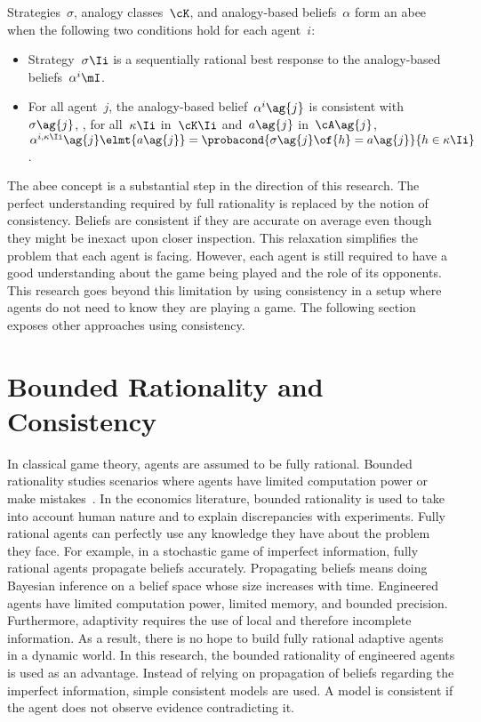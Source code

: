 Strategies~\(\sigma\), analogy classes~\(\cK\), and analogy-based beliefs~\(\alpha\) form an \ac{abee} when the following two conditions hold for each agent~\(i\):
\begin{itemize}
\item Strategy~\(\sigma\Ii\) is a sequentially rational best response to the analogy-based beliefs~\(\alpha\belief{i}\mI\).
\item For all agent~\(j\), the analogy-based belief~\(\alpha\belief{i}\ag{j}\) is consistent with~\(\sigma\ag{j}\), \ie, for all~\(\kappa\Ii\) in~\(\cK\Ii\) and~\(a\ag{j}\) in~\(\cA\ag{j}\), \(\alpha\belief{i, \kappa\Ii}\ag{j}\elmt{a\ag{j}} = \probacond{\sigma\ag{j} \of{h} = a\ag{j}}{h \in \kappa\Ii}\).
\end{itemize}

The \ac{abee} concept is a substantial step in the direction of this research.
The perfect understanding required by full rationality is replaced by the notion of consistency.
Beliefs are consistent if they are accurate on average even though they might be inexact upon closer inspection.
This relaxation simplifies the problem that each agent is facing.
However, each agent is still required to have a good understanding about the game being played and the role of its opponents.
This research goes beyond this limitation by using consistency in a setup where agents do not need to know they are playing a game.
The following section exposes other approaches using consistency.


\section{Bounded Rationality and Consistency}

In classical game theory, agents are assumed to be fully rational.
Bounded rationality studies scenarios where agents have limited computation power or make mistakes~\cite{rubinstein:1998}.
In the economics literature, bounded rationality is used to take into account human nature and to explain discrepancies with experiments.
Fully rational agents can perfectly use any knowledge they have about the problem they face.
For example, in a stochastic game of imperfect information, fully rational agents propagate beliefs accurately.
Propagating beliefs means doing Bayesian inference on a belief space whose size increases with time.
Engineered agents have limited computation power, limited memory, and bounded precision.
Furthermore, adaptivity requires the use of local and therefore incomplete information.
As a result, there is no hope to build fully rational adaptive agents in a dynamic world.
In this research, the bounded rationality of engineered agents is used as an advantage.
Instead of relying on propagation of beliefs regarding the imperfect information, simple consistent models are used.
A model is consistent if the agent does not observe evidence contradicting it.

